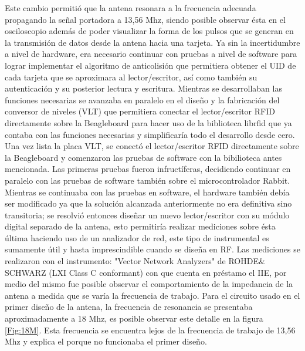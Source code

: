 Este cambio permitió que la antena resonara a la frecuencia adecuada propagando la señal portadora a 13,56 Mhz, siendo posible observar ésta en el osciloscopio además de poder visualizar la forma de los pulsos que se generan en la transmisión de datos desde la antena hacia una tarjeta.
Ya sin la incertidumbre a nivel de hardware, era necesario continuar con pruebas a nivel de software para lograr implementar el algoritmo de anticolisión que permitiera obtener el UID de cada tarjeta que se aproximara al lector/escritor, así como también su autenticación y su posterior lectura y escritura. Mientras se desarrollaban las funciones necesarias se avanzaba en paralelo en el diseño y la fabricación del conversor de niveles (VLT) que permitiera conectar el lector/escritor RFID directamente sobre la Beagleboard para hacer uso de la biblioteca librfid que ya contaba con las funciones necesarias y simplificaría todo el desarrollo desde cero.
Una vez lista la placa VLT, se conectó el lector/escritor RFID directamente sobre la Beagleboard y comenzaron las pruebas de software con la bibilioteca antes mencionada. Las primeras pruebas fueron infructíferas, decidiendo continuar en paralelo con las pruebas de software también sobre el microcontrolador Rabbit. 
Mientras se continuaba con las pruebas en software, el hardware también debía ser modificado ya que la solución alcanzada anteriormente no era definitiva sino transitoria; se resolvió entonces diseñar un nuevo lector/escritor con su módulo digital separado de la antena, esto permitiría realizar mediciones sobre ésta última haciendo uso de un analizador de red, este tipo de instrumental es sumamente útil y hasta imprescindible cuando se diseña en RF.
Las mediciones se realizaron con el instrumento: "Vector Network Analyzers" de 
ROHDE$\&$SCHWARZ (LXI Class C conformant) con que cuenta en préstamo el IIE, por medio del mismo fue posible observar el comportamiento de la impedancia de la antena a medida que se varía la frecuencia de trabajo.
Para el circuito usado en el primer diseño de la antena, la frecuencia de resonancia se presentaba aproximadamente a 18 Mhz, es posible observar este detalle en la figura \ref{Fig:18M}. Esta frecuencia se encuentra lejos de la frecuencia de trabajo de 13,56 Mhz y explica el porque no funcionaba el primer diseño.

